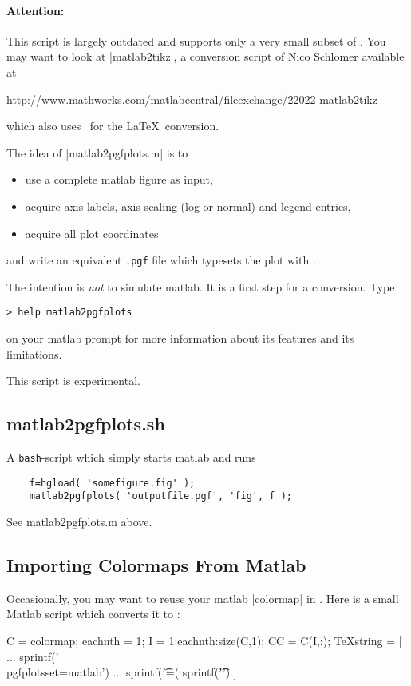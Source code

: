 {\begin{pgfgraphicnamed}
\paragraph{Attention:} This script is largely outdated and supports only a very small subset of \PGFPlots. You may want to look at |matlab2tikz|, a conversion script of Nico Schl\"omer available at

\url{http://www.mathworks.com/matlabcentral/fileexchange/22022-matlab2tikz}

\noindent which also uses \PGFPlots\ for the \LaTeX\ conversion.

\medskip
The idea of |matlab2pgfplots.m| is to
\begin{itemize}
	\item use a complete matlab figure as input,
	\item acquire axis labels, axis scaling (log or normal) and legend entries,
	\item acquire all plot coordinates
\end{itemize}
and write an equivalent \texttt{.pgf} file which typesets the plot with \PGFPlots.

The intention is \emph{not} to simulate matlab. It is a first step for a conversion. Type
\begin{lstlisting}
> help matlab2pgfplots
\end{lstlisting}
on your matlab prompt for more information about its features and its limitations.

This script is experimental.

\subsection{matlab2pgfplots.sh}
A \texttt{bash}-script which simply starts matlab and runs 
\begin{lstlisting}
	f=hgload( 'somefigure.fig' );
	matlab2pgfplots( 'outputfile.pgf', 'fig', f );
\end{lstlisting}
See matlab2pgfplots.m above.

\subsection{Importing Colormaps From Matlab}
Occasionally, you may want to reuse your matlab |colormap| in \PGFPlots. Here is a small Matlab script which converts it to \PGFPlots:
\begin{codeexample}
C = colormap;  %
eachnth = 1;
I = 1:eachnth:size(C,1); %
CC = C(I,:);
TeXstring = [ ...
 sprintf('\\pgfplotsset{\n\tcolormap={matlab}{\n') ...
 sprintf('\t\trgb=(%
 sprintf('\t}\n}\n') ]
\end{codeexample}


\end{pgfgraphicnamed}}
